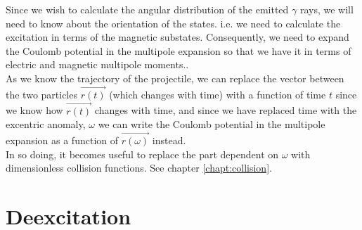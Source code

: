 Since we wish to calculate the angular distribution of the emitted $\gamma$
rays, we will need to know about the orientation of the states. i.e. we need
to calculate the excitation in terms of the magnetic substates.
Consequently, we need to expand the Coulomb potential in the multipole
expansion so that we have it in terms of electric and magnetic multipole
moments..\\

As we know the trajectory of the projectile, we can replace the vector
between the two particles $\vec{r(t)}$ (which changes with time) with a
function of time $t$ since we know how $\vec{r(t)}$ changes with time, and
since we have replaced time with the excentric anomaly, $\omega$ we can
write the Coulomb potential in the multipole expansion as a function of
$\vec{r(\omega)}$ instead.\\

In so doing, it becomes useful to replace the part dependent on $\omega$
with dimensionless collision functions. See chapter \ref{chapt:collision}.

\section{Deexcitation}
